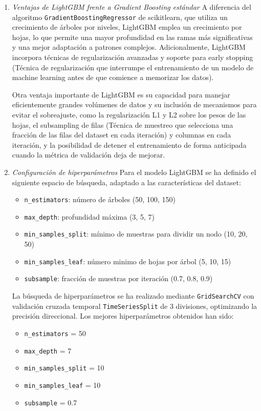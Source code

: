 \begin{enumerate}
    \item \emph{Ventajas de LightGBM frente a Gradient Boosting estándar}
    A diferencia del algoritmo \texttt{GradientBoostingRegressor} de scikitlearn, que utiliza un crecimiento de árboles por niveles, LightGBM emplea un crecimiento por hojas, lo que permite una mayor profundidad en las ramas más significativas y una mejor adaptación a patrones complejos. Adicionalmente, LightGBM incorpora técnicas de regularización avanzadas y soporte para early stopping (Técnica de regularización que interrumpe el entrenamiento de un modelo de machine learning antes de que comience a memorizar los datos).

    Otra ventaja importante de LightGBM es su capacidad para manejar eficientemente grandes volúmenes de datos y su inclusión de mecanismos para evitar el sobreajuste, como la regularización L1 y L2 sobre los pesos de las hojas, el subsampling de filas (Técnica de muestreo que selecciona una fracción de las filas del dataset en cada iteración) y columnas en cada iteración, y la posibilidad de detener el entrenamiento de forma anticipada cuando la métrica de validación deja de mejorar.

    \item \emph{Configuración de hiperparámetros}
    Para el modelo LightGBM se ha definido el siguiente espacio de búsqueda, adaptado a las características del dataset:

    \begin{itemize}
        \item \texttt{n\_estimators}: número de árboles (50, 100, 150)
        \item \texttt{max\_depth}: profundidad máxima (3, 5, 7)
        \item \texttt{min\_samples\_split}: mínimo de muestras para dividir un nodo (10, 20, 50)
        \item \texttt{min\_samples\_leaf}: número minimo de hojas por árbol (5, 10, 15)
        \item \texttt{subsample}: fracción de muestras por iteración (0.7, 0.8, 0.9)
    \end{itemize}

    La búsqueda de hiperparámetros se ha realizado mediante \texttt{GridSearchCV} con validación cruzada temporal \texttt{TimeSeriesSplit} de 3 divisiones, optimizando la precisión direccional. Los mejores hiperparámetros obtenidos han sido:

    \begin{itemize}
        \item \texttt{n\_estimators} = 50
        \item \texttt{max\_depth} = 7
        \item \texttt{min\_samples\_split} = 10
        \item \texttt{min\_samples\_leaf} = 10
        \item \texttt{subsample} = 0.7
    \end{itemize}


\end{enumerate}

